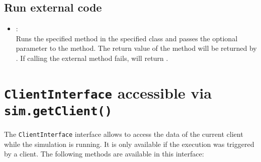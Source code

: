\section{Run external code}

\begin{itemize}

\item
{}:\\
Runs the specified method in the specified class and passes the optional parameter  to the method.
The return value of the method will be returned by . If calling the external method fails,
 will return .

\end{itemize}



\chapter{\texttt{ClientInterface} accessible via \texttt{sim.getClient()}}

The \texttt{ClientInterface} interface allows to access the data of the current
client while the simulation is running. It is only available if the execution
was triggered by a client. The following methods are available in this interface:

